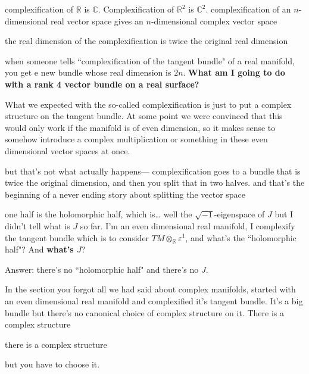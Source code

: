 complexification of \(\mathbb{R}\) is \(\mathbb{C}\). Complexification of \(\mathbb{R}^2\) is \(\mathbb{C}^2\). complexification of an \(n\)-dimensional real vector space gives an \(n\)-dimensional complex vector space
\begin{tcolorbox}[colback=white,colframe=black,boxrule=0.5pt,sharp corners]
the real dimension of the complexification is twice the original real dimension
\end{tcolorbox}
when someone tells ``complexification of the tangent bundle" of a real manifold, you get e new bundle whose real dimension is \(2n\). \textbf{What am I going to do with a rank 4 vector bundle on a real surface?}

What we expected with the so-called complexification is just to put a complex structure on the tangent bundle. At some point we were convinced that this would only work if the manifold is of even dimension, so it makes sense to somehow introduce a complex multiplication or something in these even dimensional vector spaces at once.

but that's not what actually happens--- complexification goes to a bundle that is twice the original dimension, and then you split that in two halves. and that's the beginning of a never ending story about splitting the vector space

one half is the holomorphic half, which is… well the \(\sqrt{-1}\)-eigenspace of \(J\) but I didn't tell what is \(J\) so far. I'm an even dimensional real manifold, I complexify the tangent bundle which is to consider \(TM \otimes_\mathbb{R} \varepsilon^1\), and what's the ``holomorphic half"? And \textbf{what's \(J\)}?

Answer: there's no ``holomorphic half" and there's no \(J\).

In the section you forgot all we had said about complex manifolds, started with an even dimensional real manifold and complexified it's tangent bundle. It's a big bundle but there's no canonical choice of complex structure on it. There is a complex structure
\begin{thm}\leavevmode
there is a complex structure
\end{thm}
but you have to choose it.


